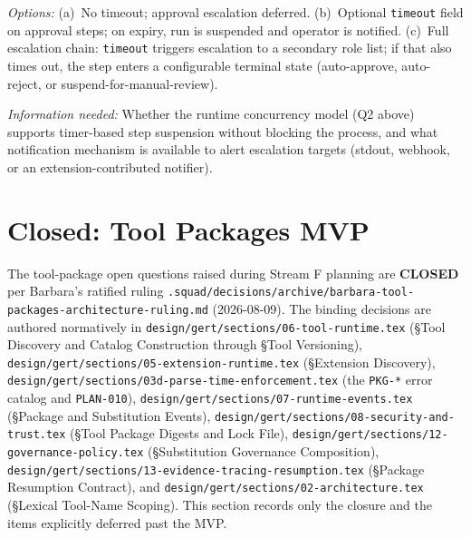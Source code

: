 \begin{enumerate}[label=\textbf{Q\arabic*.}]
    \textit{Options:} (a)~No timeout; approval escalation deferred. (b)~Optional
    \texttt{timeout} field on approval steps; on expiry, run is suspended and operator is notified.
    (c)~Full escalation chain: \texttt{timeout} triggers escalation to a secondary role list; if that
    also times out, the step enters a configurable terminal state (auto-approve, auto-reject, or
    suspend-for-manual-review).

    \textit{Information needed:} Whether the runtime concurrency model (Q2 above) supports
    timer-based step suspension without blocking the process, and what notification mechanism is
    available to alert escalation targets (stdout, webhook, or an extension-contributed notifier).

\end{enumerate}

\section{Closed: Tool Packages MVP}
\label{sec:closed-tool-packages}

The tool-package open questions raised during Stream F planning are \textbf{CLOSED} per Barbara's
ratified ruling
\texttt{.squad/decisions/archive/barbara-tool-packages-architecture-ruling.md} (2026-08-09). The
binding decisions are authored normatively in
\texttt{design/gert/sections/06-tool-runtime.tex} (\S Tool Discovery and Catalog Construction
through \S Tool Versioning), \texttt{design/gert/sections/05-extension-runtime.tex}
(\S Extension Discovery), \texttt{design/gert/sections/03d-parse-time-enforcement.tex} (the
\texttt{PKG-*} error catalog and \texttt{PLAN-010}), \texttt{design/gert/sections/07-runtime-events.tex}
(\S Package and Substitution Events), \texttt{design/gert/sections/08-security-and-trust.tex}
(\S Tool Package Digests and Lock File), \texttt{design/gert/sections/12-governance-policy.tex}
(\S Substitution Governance Composition), \texttt{design/gert/sections/13-evidence-tracing-resumption.tex}
(\S Package Resumption Contract), and \texttt{design/gert/sections/02-architecture.tex}
(\S Lexical Tool-Name Scoping). This section records only the closure and the items explicitly
deferred past the MVP.

